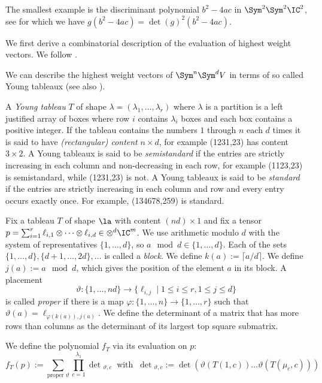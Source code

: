 The smallest example is the discriminant polynomial $b^2-4ac$ in $\Sym^2 \Sym^2 \IC^2$, see \cite[Exa.~9.1.4]{BI:17} for which we have $g(b^2-4ac) = \det(g)^2 (b^2-4ac)$.


%
%
%
%
We first derive a combinatorial description of the evaluation of highest weight vectors. We follow \cite{cheung2017symmetrizing, BI:17b}.

We can describe the highest weight vectors of $\Sym^n\Sym^d V$ in terms of so called Young tableaux (see also \cite[\S3.9]{Ott:13}).
\begin{definition}
    A \emph{Young tableau} $T$ of shape $\lambda = (\lambda_1, \ldots, \lambda_r)$ where $\lambda$ is a partition is a left justified array of boxes where row $i$ contains $\lambda_i$ boxes and each box contains a positive integer.
    If the tableau contains the numbers $1$ through $n$ each $d$ times it is said to have \emph{(rectangular) content} $n \times d$, for example {\tiny\young(1231,23)} has content $3\times 2$.
    A Young tableaux is said to be \emph{semistandard} if the entries are strictly increasing in each column and non-decreasing in each row, for example {\tiny\young(1123,23)} is semistandard, while {\tiny\young(1231,23)} is not.
    A Young tableaux is said to be \emph{standard} if the entries are strictly increasing in each column and row and every entry occurs exactly once. For example, {\tiny\young(134678,259)} is standard.
\end{definition}

Fix a tableau $T$ of shape $\la$ with content $(nd)\times 1$ and fix a tensor $p = \sum_{i=1}^r \ell_{i,1}\otimes\cdots\otimes\ell_{i,d} \in \otimes^d \IC^m$.
We use arithmetic modulo $d$ with the system of representatives $\{1,\ldots,d\}$, so $a \mod d \in \{1,\ldots,d\}$.
Each of the sets $\{1,\ldots,d\}, \{d+1,\ldots,2d\},\ldots$ is called a \emph{block}.
We define $k(a) := \lceil a / d\rceil$. We define $j(a) := a \mod d$, which gives the position of the element $a$ in its block.
A placement
\[
\vartheta : \{1, \ldots, nd\} \to \{\ell_{i,j} \mid 1 \leq i \leq r, 1 \leq j \leq d\}
\]
is called \emph{proper} if
there is a map $\varphi:\{1,\ldots,n\}\to\{1,\ldots,r\}$
such that
$\vartheta(a) = \ell_{\varphi(k(a)),j(a)}$.
We define the determinant of a matrix that has more rows than columns as the determinant of its largest top square submatrix.

We define the polynomial $f_T$ via its evaluation on $p$:
\begin{equation}\label{eq:sumpropertheta}
    f_T(p)
    := \sum_{\text{proper\ }\vartheta} \prod_{c = 1}^{\lambda_1}\det{}_{\vartheta, c} \ \text{ with } \ \det{}_{\vartheta, c} := \det\left(\vartheta(T(1, c)) \dots \vartheta(T(\mu_c, c))\right)
\end{equation}

